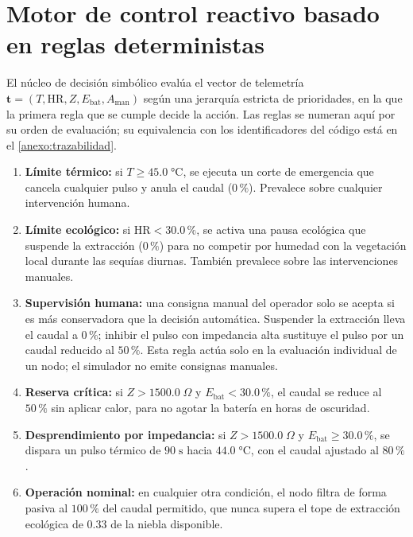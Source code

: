 \section{Motor de control reactivo basado en reglas deterministas}
\label{sec:motor_reglas}
El n\'ucleo de decisi\'on simb\'olico eval\'ua el vector de telemetr\'ia $\mathbf{t} = (T, \text{HR}, Z, E_{\text{bat}}, A_{\text{man}})$ seg\'un una jerarqu\'ia estricta de prioridades, en la que la primera regla que se cumple decide la acci\'on. Las reglas se numeran aqu\'i por su orden de evaluaci\'on; su equivalencia con los identificadores del c\'odigo est\'a en el \cref{anexo:trazabilidad}.
\begin{enumerate}[label=\textbf{R\arabic*},leftmargin=*]
  \item \textbf{L\'imite t\'ermico:} si $T \ge 45.0\;\si{\celsius}$, se ejecuta un corte de emergencia que cancela cualquier pulso y anula el caudal ($0\,\%$). Prevalece sobre cualquier intervenci\'on humana.
  \item \textbf{L\'imite ecol\'ogico:} si $\text{HR} < 30.0\,\%$, se activa una pausa ecol\'ogica que suspende la extracci\'on ($0\,\%$) para no competir por humedad con la vegetaci\'on local durante las sequ\'ias diurnas. Tambi\'en prevalece sobre las intervenciones manuales.
  \item \textbf{Supervisi\'on humana:} una consigna manual del operador solo se acepta si es m\'as conservadora que la decisi\'on autom\'atica. Suspender la extracci\'on lleva el caudal a $0\,\%$; inhibir el pulso con impedancia alta sustituye el pulso por un caudal reducido al $50\,\%$. Esta regla act\'ua solo en la evaluaci\'on individual de un nodo; el simulador no emite consignas manuales.
  \item \textbf{Reserva cr\'itica:} si $Z > 1500.0\;\Omega$ y $E_{\text{bat}} < 30.0\,\%$, el caudal se reduce al $50\,\%$ sin aplicar calor, para no agotar la bater\'ia en horas de oscuridad.
  \item \textbf{Desprendimiento por impedancia:} si $Z > 1500.0\;\Omega$ y $E_{\text{bat}} \ge 30.0\,\%$, se dispara un pulso t\'ermico de $90\;\text{s}$ hacia $44.0\;\si{\celsius}$, con el caudal ajustado al $80\,\%$.
  \item \textbf{Operaci\'on nominal:} en cualquier otra condici\'on, el nodo filtra de forma pasiva al $100\,\%$ del caudal permitido, que nunca supera el tope de extracci\'on ecol\'ogica de $0.33$ de la niebla disponible.
\end{enumerate}

